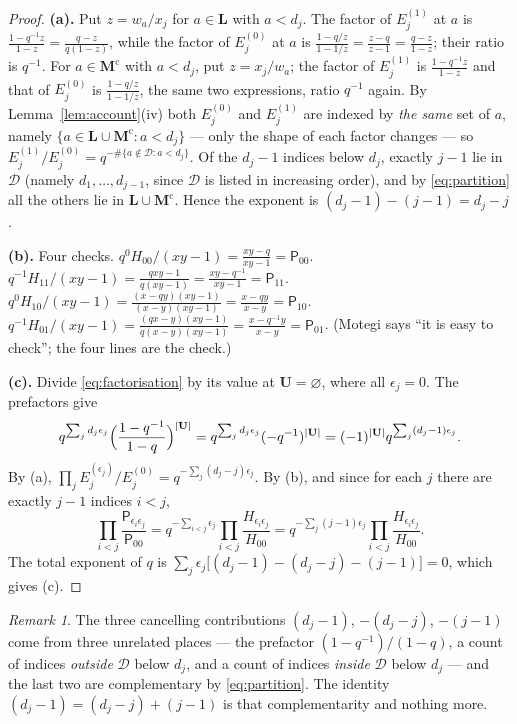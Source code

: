 \documentclass[11pt]{article}
\theoremstyle{plain}
\theoremstyle{definition}
\theoremstyle{remark}
\newtheorem{rem}[thm]{Remark}
\newcommand{\bM}{\mathbf M}
\newcommand{\bL}{\mathbf L}
\newcommand{\bU}{\mathbf U}
\newcommand{\cD}{\mathcal D}
\newcommand{\cm}{{\mathrm c}}
\begin{document}
\begin{proof}
\textbf{(a).} Put $z=w_a/x_j$ for $a\in\bL$ with $a<d_j$. The factor of
$E_j^{(1)}$ at $a$ is $\frac{1-q^{-1}z}{1-z}=\frac{q-z}{q(1-z)}$, while the factor
of $E_j^{(0)}$ at $a$ is $\frac{1-q/z}{1-1/z}=\frac{z-q}{z-1}=\frac{q-z}{1-z}$;
their ratio is $q^{-1}$. For $a\in\bM^\cm$ with $a<d_j$, put $z=x_j/w_a$; the
factor of $E_j^{(1)}$ is $\frac{1-q^{-1}z}{1-z}$ and that of $E_j^{(0)}$ is
$\frac{1-q/z}{1-1/z}$, the same two expressions, ratio $q^{-1}$ again. By
Lemma~\ref{lem:account}(iv) both $E_j^{(0)}$ and $E_j^{(1)}$ are indexed by
\emph{the same} set of $a$, namely $\{a\in\bL\cup\bM^\cm:a<d_j\}$ --- only the
shape of each factor changes --- so $E_j^{(1)}/E_j^{(0)}=q^{-\#\{a\notin\cD:a<d_j\}}$.
Of the $d_j-1$ indices below $d_j$, exactly $j-1$ lie in $\cD$ (namely
$d_1,\dots,d_{j-1}$, since $\cD$ is listed in increasing order), and by
\eqref{eq:partition} all the others lie in $\bL\cup\bM^\cm$. Hence the exponent is
$(d_j-1)-(j-1)=d_j-j$.

\textbf{(b).} Four checks.
$q^{0}H_{00}/(xy-1)=\frac{xy-q}{xy-1}=\mathsf P_{00}$.
$q^{-1}H_{11}/(xy-1)=\frac{qxy-1}{q(xy-1)}=\frac{xy-q^{-1}}{xy-1}=\mathsf P_{11}$.
$q^{0}H_{10}/(xy-1)=\frac{(x-qy)(xy-1)}{(x-y)(xy-1)}=\frac{x-qy}{x-y}=\mathsf P_{10}$.
$q^{-1}H_{01}/(xy-1)=\frac{(qx-y)(xy-1)}{q(x-y)(xy-1)}=\frac{x-q^{-1}y}{x-y}
=\mathsf P_{01}$.
(Motegi says ``it is easy to check''; the four lines are the check.)

\textbf{(c).} Divide \eqref{eq:factorisation} by its value at $\bU=\varnothing$,
where all $\epsilon_j=0$. The prefactors give
\[
q^{\sum_j d_j\epsilon_j}\Bigl(\frac{1-q^{-1}}{1-q}\Bigr)^{|\bU|}
=q^{\sum_j d_j\epsilon_j}(-q^{-1})^{|\bU|}
=(-1)^{|\bU|}q^{\sum_j(d_j-1)\epsilon_j}.
\]
By (a), $\prod_j E_j^{(\epsilon_j)}/E_j^{(0)}=q^{-\sum_j(d_j-j)\epsilon_j}$. By (b),
and since for each $j$ there are exactly $j-1$ indices $i<j$,
\[
\prod_{i<j}\frac{\mathsf P_{\epsilon_i\epsilon_j}}{\mathsf P_{00}}
=q^{-\sum_{i<j}\epsilon_j}\prod_{i<j}\frac{H_{\epsilon_i\epsilon_j}}{H_{00}}
=q^{-\sum_j(j-1)\epsilon_j}\prod_{i<j}\frac{H_{\epsilon_i\epsilon_j}}{H_{00}} .
\]
The total exponent of $q$ is
$\sum_j\epsilon_j\bigl[(d_j-1)-(d_j-j)-(j-1)\bigr]=0$, which gives (c).
\end{proof}

\begin{rem}
The three cancelling contributions $(d_j-1)$, $-(d_j-j)$, $-(j-1)$ come from three
unrelated places --- the prefactor $(1-q^{-1})/(1-q)$, a count of indices
\emph{outside} $\cD$ below $d_j$, and a count of indices \emph{inside} $\cD$ below
$d_j$ --- and the last two are complementary by \eqref{eq:partition}. The identity
$(d_j-1)=(d_j-j)+(j-1)$ is that complementarity and nothing more.
\end{rem}
\end{document}
